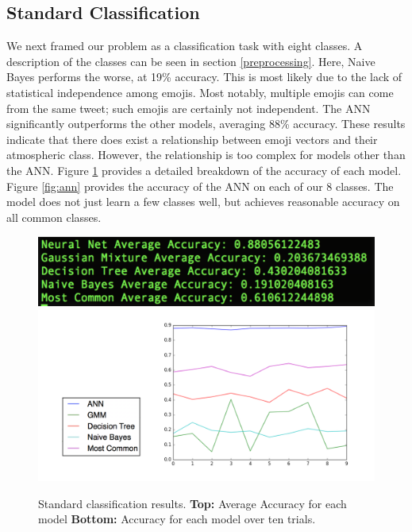 \documentclass[12pt]{article}
\begin{document}
\subsection{Standard Classification}
We next framed our problem as a classification task with eight classes. A description of the classes can be seen in section \ref{preprocessing}. Here, Naive Bayes performs the worse, at 19\% accuracy. This is most likely due to the lack of statistical independence among emojis. Most notably, multiple emojis can come from the same tweet; such emojis are certainly not independent. The ANN significantly outperforms the other models, averaging 88\% accuracy. These results indicate that there does exist a relationship between emoji vectors and their atmospheric class. However, the relationship is too complex for models other than the ANN. Figure \ref{fig:standard} provides a detailed breakdown of the accuracy of each model. Figure \ref{fig:ann} provides the accuracy of the ANN on each of our 8 classes. The model does not just learn a few classes well, but achieves reasonable accuracy on all common classes.

\begin{figure}[H]
\includegraphics[scale=0.6]{standardavg}
\includegraphics[scale=0.7]{standardgraph}
\centering
\caption{Standard classification results. \textbf{Top:} Average Accuracy for each model \textbf{Bottom:} Accuracy for each model over ten trials.}
\label{fig:standard}
\end{figure}
\end{document}
